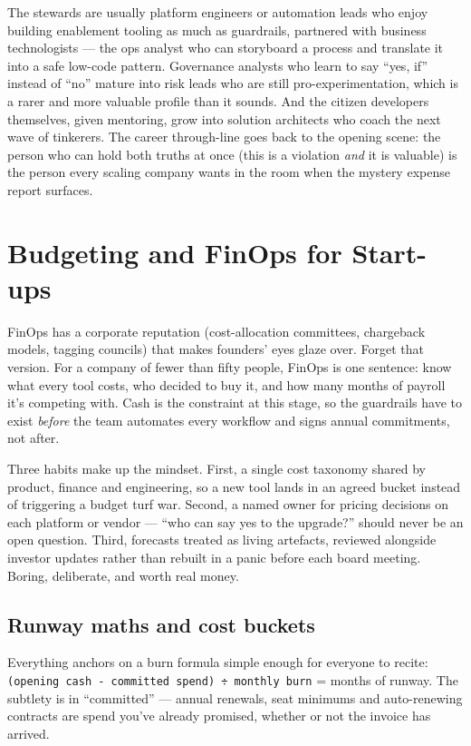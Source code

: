 The stewards are usually platform engineers or automation leads who enjoy building enablement tooling as much as guardrails, partnered with business technologists — the ops analyst who can storyboard a process and translate it into a safe low-code pattern. Governance analysts who learn to say ``yes, if'' instead of ``no'' mature into risk leads who are still pro-experimentation, which is a rarer and more valuable profile than it sounds. And the citizen developers themselves, given mentoring, grow into solution architects who coach the next wave of tinkerers. The career through-line goes back to the opening scene: the person who can hold both truths at once (this is a violation \emph{and} it is valuable) is the person every scaling company wants in the room when the mystery expense report surfaces.

\section{Budgeting and FinOps for Start-ups}
FinOps has a corporate reputation (cost-allocation committees, chargeback models, tagging councils) that makes founders' eyes glaze over. Forget that version. For a company of fewer than fifty people, FinOps is one sentence: know what every tool costs, who decided to buy it, and how many months of payroll it's competing with. Cash is the constraint at this stage, so the guardrails have to exist \emph{before} the team automates every workflow and signs annual commitments, not after.


Three habits make up the mindset. First, a single cost taxonomy shared by product, finance and engineering, so a new tool lands in an agreed bucket instead of triggering a budget turf war. Second, a named owner for pricing decisions on each platform or vendor — ``who can say yes to the upgrade?'' should never be an open question. Third, forecasts treated as living artefacts, reviewed alongside investor updates rather than rebuilt in a panic before each board meeting. Boring, deliberate, and worth real money.



\subsection{Runway maths and cost buckets}


Everything anchors on a burn formula simple enough for everyone to recite: \texttt{(opening cash - committed spend) ÷ monthly burn} = months of runway. The subtlety is in ``committed'' — annual renewals, seat minimums and auto-renewing contracts are spend you've already promised, whether or not the invoice has arrived.


